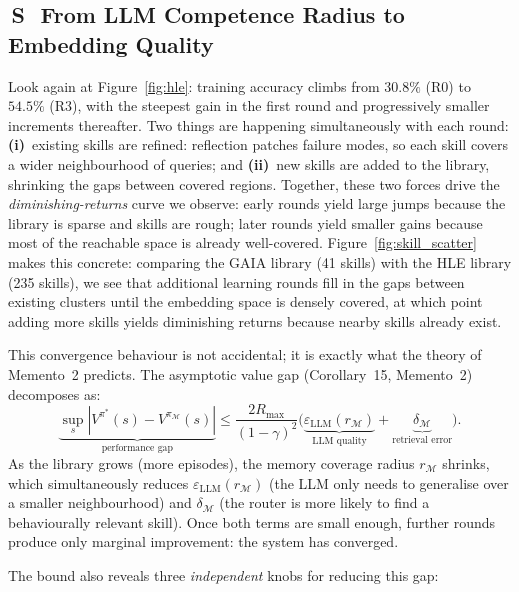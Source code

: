 \documentclass[11pt,a4paper]{article}
\newcommand{\Stag}{{\sffamily\bfseries\colorbox{sharedBG}{\color{black!60}\,S\,}}}
\begin{document}
\subsection{\Stag~From LLM Competence Radius to Embedding Quality}
\label{sec:bridge2}

\begin{bridgebox}

\sffamily\small
Look again at Figure~\ref{fig:hle}: training accuracy climbs from $30.8\%$ (R0) to $54.5\%$ (R3), with the steepest gain in the first round and progressively smaller increments thereafter.
Two things are happening simultaneously with each round: \textbf{(i)}~existing skills are refined: reflection patches failure modes, so each skill covers a wider neighbourhood of queries; and \textbf{(ii)}~new skills are added to the library, shrinking the gaps between covered regions.
Together, these two forces drive the \emph{diminishing-returns} curve we observe: early rounds yield large jumps because the library is sparse and skills are rough; later rounds yield smaller gains because most of the reachable space is already well-covered.
Figure~\ref{fig:skill_scatter} makes this concrete: comparing the GAIA library (41 skills) with the HLE library (235 skills), we see that additional learning rounds fill in the gaps between existing clusters until the embedding space is densely covered, at which point adding more skills yields diminishing returns because nearby skills already exist.

\vspace{4pt}
This convergence behaviour is not accidental; it is exactly what the theory of Memento~2 predicts.
The asymptotic value gap (Corollary~15, Memento~2) decomposes as:
\[
  \underbrace{\sup_s |V^{\pi^*}(s) - V^{\pi_\mathcal{M}}(s)|}_{\text{performance gap}} \leq \frac{2R_{\max}}{(1-\gamma)^2} \bigl(\underbrace{\varepsilon_{\mathrm{LLM}}(r_\mathcal{M})}_{\text{LLM quality}} + \underbrace{\delta_\mathcal{M}}_{\text{retrieval error}}\bigr).
\]
As the library grows (more episodes), the memory coverage radius $r_\mathcal{M}$ shrinks, which simultaneously reduces $\varepsilon_{\mathrm{LLM}}(r_\mathcal{M})$ (the LLM only needs to generalise over a smaller neighbourhood) and $\delta_\mathcal{M}$ (the router is more likely to find a behaviourally relevant skill).  Once both terms are small enough, further rounds produce only marginal improvement: the system has converged.

\vspace{4pt}
The bound also reveals three \emph{independent} knobs for reducing this gap:


\end{bridgebox}
\end{document}
